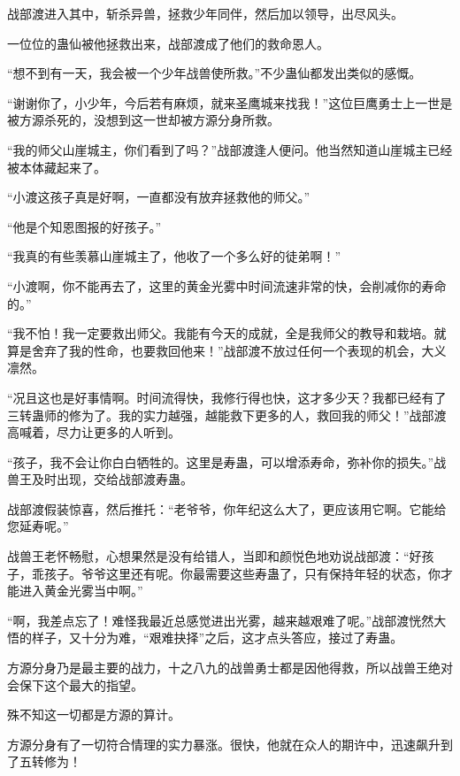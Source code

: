 \begin{this_body}
战部渡进入其中，斩杀异兽，拯救少年同伴，然后加以领导，出尽风头。

一位位的蛊仙被他拯救出来，战部渡成了他们的救命恩人。

“想不到有一天，我会被一个少年战兽使所救。”不少蛊仙都发出类似的感慨。

“谢谢你了，小少年，今后若有麻烦，就来圣鹰城来找我！”这位巨鹰勇士上一世是被方源杀死的，没想到这一世却被方源分身所救。

“我的师父山崖城主，你们看到了吗？”战部渡逢人便问。他当然知道山崖城主已经被本体藏起来了。

“小渡这孩子真是好啊，一直都没有放弃拯救他的师父。”

“他是个知恩图报的好孩子。”

“我真的有些羡慕山崖城主了，他收了一个多么好的徒弟啊！”

“小渡啊，你不能再去了，这里的黄金光雾中时间流速非常的快，会削减你的寿命的。”

“我不怕！我一定要救出师父。我能有今天的成就，全是我师父的教导和栽培。就算是舍弃了我的性命，也要救回他来！”战部渡不放过任何一个表现的机会，大义凛然。

“况且这也是好事情啊。时间流得快，我修行得也快，这才多少天？我都已经有了三转蛊师的修为了。我的实力越强，越能救下更多的人，救回我的师父！”战部渡高喊着，尽力让更多的人听到。

“孩子，我不会让你白白牺牲的。这里是寿蛊，可以增添寿命，弥补你的损失。”战兽王及时出现，交给战部渡寿蛊。

战部渡假装惊喜，然后推托：“老爷爷，你年纪这么大了，更应该用它啊。它能给您延寿呢。”

战兽王老怀畅慰，心想果然是没有给错人，当即和颜悦色地劝说战部渡：“好孩子，乖孩子。爷爷这里还有呢。你最需要这些寿蛊了，只有保持年轻的状态，你才能进入黄金光雾当中啊。”

“啊，我差点忘了！难怪我最近总感觉进出光雾，越来越艰难了呢。”战部渡恍然大悟的样子，又十分为难，“艰难抉择”之后，这才点头答应，接过了寿蛊。

方源分身乃是最主要的战力，十之八九的战兽勇士都是因他得救，所以战兽王绝对会保下这个最大的指望。

殊不知这一切都是方源的算计。

方源分身有了一切符合情理的实力暴涨。很快，他就在众人的期许中，迅速飙升到了五转修为！

\end{this_body}

